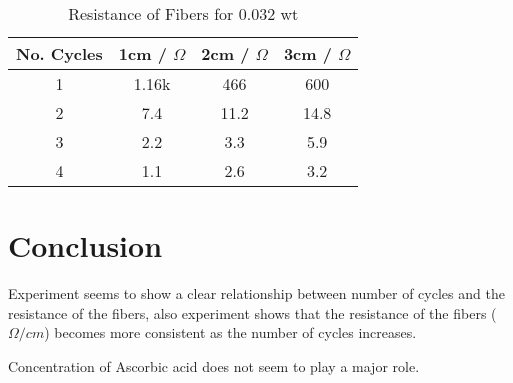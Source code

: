 \documentclass{article}
\begin{document}
\begin{table}[h!]
\centering
\begin{tabular}{ |c|c|c|c| } 
    \hline
    No. Cycles &  1cm / $\Omega$ & 2cm / $\Omega$ & 3cm / $\Omega$  \\
    \hline
    1 & 1.16k & 466 & 600\\
    2 & 7.4 & 11.2 & 14.8\\
    3 & 2.2 & 3.3 & 5.9\\
    4 & 1.1 & 2.6 & 3.2\\
    \hline
\end{tabular}
 \caption{Resistance of Fibers for 0.032 wt}
\label{table:3}
\end{table}

\section{Conclusion}
Experiment seems to show a clear relationship between number of cycles and the resistance of the fibers, also experiment shows that the resistance of the fibers ($\Omega/cm$) becomes more consistent as the number of cycles increases.\smallskip

\noindent
Concentration of Ascorbic acid does not seem to play a major role.
\end{document}
